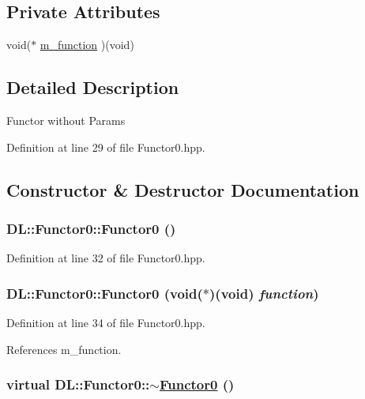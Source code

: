 \subsection*{Private Attributes}
\begin{CompactItemize}
\item 
void($\ast$ \hyperlink{classDL_1_1Functor0_r0}{m\_\-function} )(void)
\end{CompactItemize}


\subsection{Detailed Description}
Functor without Params



Definition at line 29 of file Functor0.hpp.

\subsection{Constructor \& Destructor Documentation}
\hypertarget{classDL_1_1Functor0_d0}{
\subsubsection[Functor0]{\setlength{\rightskip}{0pt plus 5cm}DL::Functor0::Functor0 ()}}
\label{classDL_1_1Functor0_d0}




Definition at line 32 of file Functor0.hpp.\hypertarget{classDL_1_1Functor0_a0}{
\subsubsection[Functor0]{\setlength{\rightskip}{0pt plus 5cm}DL::Functor0::Functor0 (void($\ast$)(void) {\em function})}}
\label{classDL_1_1Functor0_a0}




Definition at line 34 of file Functor0.hpp.

References m\_\-function.\hypertarget{classDL_1_1Functor0_a1}{
\subsubsection[$\sim$Functor0]{\setlength{\rightskip}{0pt plus 5cm}virtual DL::Functor0::$\sim$\hyperlink{classDL_1_1Functor0}{Functor0} ()}}
\label{classDL_1_1Functor0_a1}




